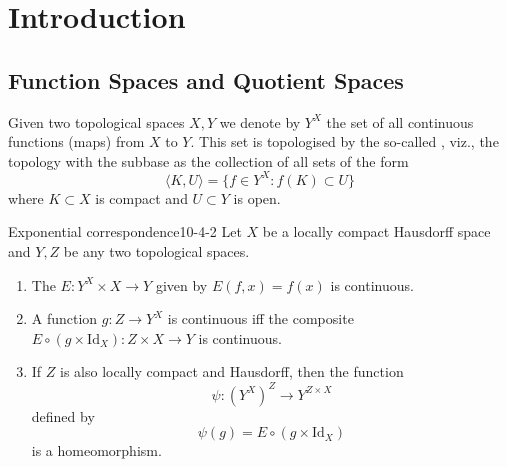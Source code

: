 \documentclass[../main.tex]{subfiles}
\begin{document}
\ifSubfilesClassLoaded{

    
}{}

\chapter{ Introduction }

\section{Function Spaces and Quotient Spaces}

\begin{definition}{}{}
    Given two topological spaces $X, Y$ we denote by $Y^X$ the set of all continuous functions (maps) from $X$ to $Y$. This set is topologised by the so-called , viz., the topology with the subbase as the collection of all sets of the form
\[
\langle K, U \rangle = \{f \in Y^X : f(K) \subset U\}
\]
where $K \subset X$ is compact and $U \subset Y$ is open.
\end{definition}

\begin{theorem}{Exponential correspondence}{10-4-2}
Let $X$ be a locally compact Hausdorff space and $Y,Z$ be any two topological spaces.
\begin{enumerate}
\item[(a)] The  $E:Y^X \times X \to Y$ given by $E(f,x) = f(x)$ is continuous.
\item[(b)] A function $g : Z \to Y^X$ is continuous iff the composite $E \circ (g \times \mathrm{Id}_X) : Z \times X \to Y$ is continuous.
\item[(c)] If $Z$ is also locally compact and Hausdorff, then the function
\[
\psi : (Y^X)^Z \to Y^{Z \times X}
\]
defined by
\[
\psi(g) = E \circ (g \times \mathrm{Id}_X)
\]
is a homeomorphism.
\end{enumerate}
\end{theorem}
\end{document}
